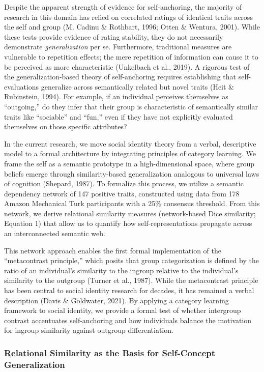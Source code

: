 \documentclass[
  man,
  longtable,
  nolmodern,
  notxfonts,
  notimes,
  man]{apa7}
\begin{document}
Despite the apparent strength of evidence for self-anchoring, the
majority of research in this domain has relied on correlated ratings of
identical traits across the self and group (M. Cadinu \& Rothbart, 1996;
Otten \& Wentura, 2001). While these tests provide evidence of rating
stability, they do not necessarily demonstrate \emph{generalization} per
se. Furthermore, traditional measures are vulnerable to repetition
effects; the mere repetition of information can cause it to be perceived
as more characteristic (Unkelbach et al., 2019). A rigorous test of the
generalization-based theory of self-anchoring requires establishing that
self-evaluations generalize across semantically related but novel traits
(Heit \& Rubinstein, 1994). For example, if an individual perceives
themselves as ``outgoing,'' do they infer that their group is
characteristic of semantically similar traits like ``sociable'' and
``fun,'' even if they have not explicitly evaluated themselves on those
specific attributes?

In the current research, we move social identity theory from a verbal,
descriptive model to a formal architecture by integrating principles of
category learning. We frame the self as a semantic prototype in a
high-dimensional space, where group beliefs emerge through
similarity-based generalization analogous to universal laws of cognition
(Shepard, 1987). To formalize this process, we utilize a semantic
dependency network of 147 positive traits, constructed using data from
178 Amazon Mechanical Turk participants with a 25\% consensus threshold.
From this network, we derive relational similarity measures
(network-based Dice similarity; Equation 1) that allow us to quantify
how self-representations propagate across an interconnected semantic
web.

This network approach enables the first formal implementation of the
``metacontrast principle,'' which posits that group categorization is
defined by the ratio of an individual's similarity to the ingroup
relative to the individual's similarity to the outgroup (Turner et al.,
1987). While the metacontrast principle has been central to social
identity research for decades, it has remained a verbal description
(Davis \& Goldwater, 2021). By applying a category learning framework to
social identity, we provide a formal test of whether intergroup contrast
accentuates self-anchoring and how individuals balance the motivation
for ingroup similarity against outgroup differentiation.

\subsubsection{Relational Similarity as the Basis for Self-Concept
Generalization}\label{relational-similarity-as-the-basis-for-self-concept-generalization}
\end{document}

